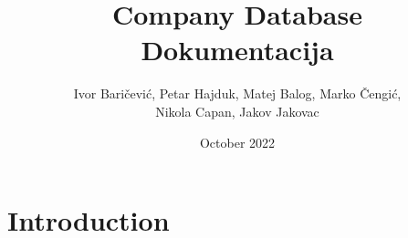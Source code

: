 \documentclass{article}
\title{Company Database \\ Dokumentacija}
\author{Ivor Baričević, Petar Hajduk, Matej Balog, Marko Čengić, \\Nikola Capan, Jakov Jakovac}
\date{October 2022}
\begin{document}
\maketitle

\section{Introduction}
\end{document}
